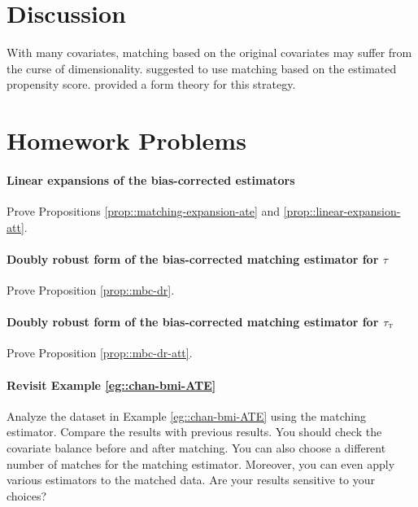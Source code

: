         

\section{Discussion}


With many covariates, matching based on the original covariates may suffer from the curse of dimensionality.      \citet{rosenbaum1983central} suggested to use matching based on the estimated propensity score.     \citet{abadie2016matching} provided a form theory for this strategy. 
         
         
         
\section{Homework Problems}

\paragraph{Linear expansions of the bias-corrected estimators}\label{para::linear-bcm-ate}


 Prove Propositions \ref{prop::matching-expansion-ate} and \ref{prop::linear-expansion-att}. 
 
 
 
\paragraph{Doubly robust form of the bias-corrected matching estimator for $\tau$}\label{para::dr-mbc-form}

Prove Proposition \ref{prop::mbc-dr}.  


\paragraph{Doubly robust form of the bias-corrected matching estimator for $\tau_\textsc{t}$}\label{para::dr-mbc-form-att}

Prove Proposition \ref{prop::mbc-dr-att}.  
 

\paragraph{Revisit Example \ref{eg::chan-bmi-ATE}}


Analyze the dataset in Example \ref{eg::chan-bmi-ATE} using the matching estimator. Compare the results with previous results.
You should check the covariate balance before and after matching. You can also choose a different number of matches for the matching estimator.  Moreover, you can even apply various estimators to the matched data. 
Are your results sensitive to your choices? 

